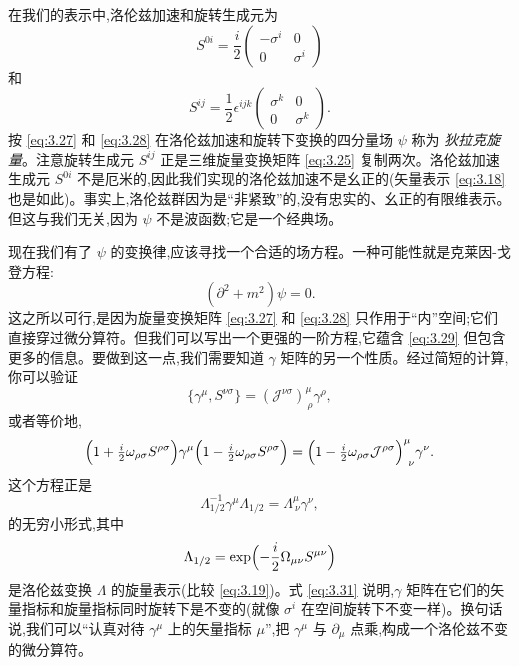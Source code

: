 在我们的表示中,洛伦兹加速和旋转生成元为
\begin{equation}
  S^{0i} = \frac{i}{2}\begin{pmatrix}-\sigma^i&0\\0&\sigma^i\end{pmatrix}
  \label{eq:3.27}
\end{equation}
和
\begin{equation}
  S^{ij} = \frac{1}{2}\epsilon^{ijk}
    \begin{pmatrix}\sigma^k&0\\0&\sigma^k\end{pmatrix}.
  \label{eq:3.28}
\end{equation}
按 \eqref{eq:3.27} 和 \eqref{eq:3.28} 在洛伦兹加速和旋转下变换的四分量场 $\psi$ 称为 \emph{狄拉克旋量}。注意旋转生成元 $S^{ij}$ 正是三维旋量变换矩阵 \eqref{eq:3.25} 复制两次。洛伦兹加速生成元 $S^{0i}$ 不是厄米的,因此我们实现的洛伦兹加速不是幺正的(矢量表示 \eqref{eq:3.18} 也是如此)。事实上,洛伦兹群因为是``非紧致''的,没有忠实的、幺正的有限维表示。但这与我们无关,因为 $\psi$ 不是波函数;它是一个经典场。

现在我们有了 $\psi$ 的变换律,应该寻找一个合适的场方程。一种可能性就是克莱因-戈登方程:
\begin{equation}
  (\partial^2 + m^2)\psi = 0 .
  \label{eq:3.29}
\end{equation}
这之所以可行,是因为旋量变换矩阵 \eqref{eq:3.27} 和 \eqref{eq:3.28} 只作用于``内''空间;它们直接穿过微分算符。但我们可以写出一个更强的一阶方程,它蕴含 \eqref{eq:3.29} 但包含更多的信息。要做到这一点,我们需要知道 $\gamma$ 矩阵的另一个性质。经过简短的计算,你可以验证
\begin{equation}
  \{\gamma^\mu, S^{\nu\sigma}\} = (\mathcal{J}^{\nu\sigma})^{\mu}_{\ \rho}
    \gamma^\rho,
  \label{eq:3.30}
\end{equation}
或者等价地,
\begin{equation}
  \Bigl( 1 + \tfrac{i}{2}\omega_{\rho\sigma}S^{\rho\sigma} \Bigr)
    \gamma^\mu
    \Bigl( 1 - \tfrac{i}{2}\omega_{\rho\sigma}S^{\rho\sigma} \Bigr)
  = \Bigl( 1 - \tfrac{i}{2}\omega_{\rho\sigma}\mathcal{J}^{\rho\sigma}
    \Bigr)^{\mu}_{\ \nu}\gamma^\nu .
\end{equation}
这个方程正是
\begin{equation}
  \Lambda^{-1}_{1/2}\gamma^\mu\Lambda_{1/2}
    = \Lambda^{\mu}_{\ \nu}\gamma^\nu,
  \label{eq:3.31}
\end{equation}
的无穷小形式,其中
\begin{equation}
  \Lambda_{1/2} = \exp\Bigl( -\frac{i}{2}\Omega_{\mu\nu}S^{\mu\nu} \Bigr)
  \label{eq:3.32}
\end{equation}
是洛伦兹变换 $\Lambda$ 的旋量表示(比较 \eqref{eq:3.19})。式 \eqref{eq:3.31} 说明,$\gamma$ 矩阵在它们的矢量指标和旋量指标同时旋转下是不变的(就像 $\sigma^i$ 在空间旋转下不变一样)。换句话说,我们可以``认真对待 $\gamma^\mu$ 上的矢量指标 $\mu$'',把 $\gamma^\mu$ 与 $\partial_\mu$ 点乘,构成一个洛伦兹不变的微分算符。

